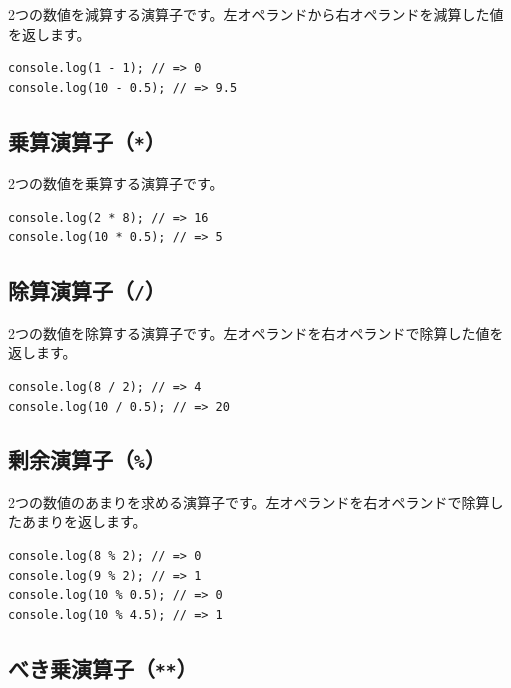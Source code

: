 2つの数値を減算する演算子です。左オペランドから右オペランドを減算した値を返します。

\begin{lstlisting}
console.log(1 - 1); // => 0
console.log(10 - 0.5); // => 9.5
\end{lstlisting}

\hypertarget{multiplication-operator}{%
\subsection{\texorpdfstring{乗算演算子（\texttt{*}）}{乗算演算子（*）}}\label{multiplication-operator}}

2つの数値を乗算する演算子です。

\begin{lstlisting}
console.log(2 * 8); // => 16
console.log(10 * 0.5); // => 5
\end{lstlisting}

\hypertarget{division-operator}{%
\subsection{\texorpdfstring{除算演算子（\texttt{/}）}{除算演算子（/）}}\label{division-operator}}

2つの数値を除算する演算子です。左オペランドを右オペランドで除算した値を返します。

\begin{lstlisting}
console.log(8 / 2); // => 4
console.log(10 / 0.5); // => 20
\end{lstlisting}

\hypertarget{modulus-operator}{%
\subsection{\texorpdfstring{剰余演算子（\texttt{\%}）}{剰余演算子（\%）}}\label{modulus-operator}}

2つの数値のあまりを求める演算子です。左オペランドを右オペランドで除算したあまりを返します。

\begin{lstlisting}
console.log(8 % 2); // => 0
console.log(9 % 2); // => 1
console.log(10 % 0.5); // => 0
console.log(10 % 4.5); // => 1
\end{lstlisting}

\hypertarget{pow-operator}{%
\subsection[べき乗演算子（\texttt{**}）]{べき乗演算子（\texttt{**}）\protect{}}\label{pow-operator}}

